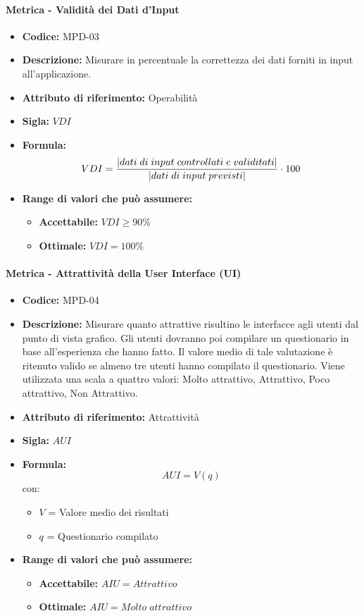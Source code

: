 \paragraph{Metrica - Validità dei Dati d'Input} 
\begin{itemize}
    \item \textbf{Codice:} MPD-03
    \item \textbf{Descrizione:} Misurare in percentuale la correttezza dei dati forniti in input all'applicazione.
    \item \textbf{Attributo di riferimento:} Operabilità
    \item \textbf{Sigla:} $VDI$
    \item \textbf{Formula:} $$VDI = {|dati \; di \; input \; controllati \; e \; validitati| \over |dati \; di \; input \; previsti|} \cdot 100$$  
    \item \textbf{Range di valori che può assumere:}
    \begin{itemize}
        \item \textbf{Accettabile:} $VDI \geq 90\%$
        \item \textbf{Ottimale:} $VDI = 100\%$
    \end{itemize}
\end{itemize}

\paragraph{Metrica - Attrattività della User Interface (UI)} 
\begin{itemize}
    \item \textbf{Codice: } MPD-04
    \item \textbf{Descrizione:} Misurare quanto attrattive risultino le interfacce agli utenti dal punto di vista grafico.
    Gli utenti dovranno poi compilare un questionario in base all'esperienza che hanno fatto.
    Il valore medio di tale valutazione è ritenuto valido se almeno tre utenti hanno compilato il questionario. 
    Viene utilizzata una scala a quattro valori: Molto attrattivo, Attrattivo, Poco attrattivo, Non Attrattivo.
    \item \textbf{Attributo di riferimento:} Attrattività
    \item \textbf{Sigla:} $AUI$
    \item \textbf{Formula:}$$AUI = V(q) $$
    con:
        \begin{itemize}
        \item $V$ = Valore medio dei risultati
        \item $q$ = Questionario compilato
        \end{itemize}
    \item \textbf{Range di valori che può assumere:}
        \begin{itemize}
            \item \textbf{Accettabile:} $AIU = Attrattivo$ 
            \item \textbf{Ottimale:} $AIU = Molto \; attrattivo$
        \end{itemize}
\end{itemize}

